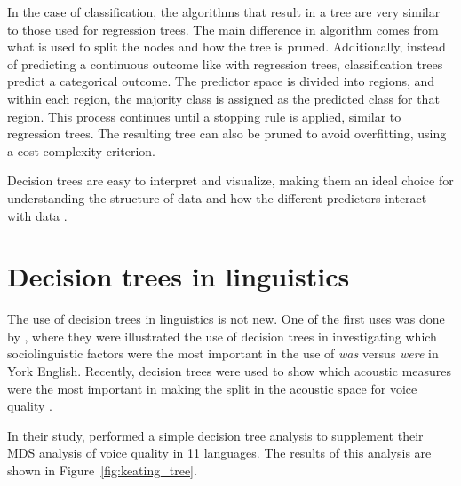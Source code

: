 In the case of classification, the algorithms that result in a tree are very similar to those used for regression trees. The main difference in algorithm comes from what is used to split the nodes and how the tree is pruned. Additionally, instead of predicting a continuous outcome like with regression trees, classification trees predict a categorical outcome. The predictor space is divided into regions, and within each region, the majority class is assigned as the predicted class for that region. This process continues until a stopping rule is applied, similar to regression trees. The resulting tree can also be pruned to avoid overfitting, using a cost-complexity criterion.

Decision trees are easy to interpret and visualize, making them an ideal choice for understanding the structure of data and how the different predictors interact with data \citep{hastieElementsStatisticalLearning2009,jamesIntroductionStatisticalLearning2021}.

\section{Decision trees in linguistics}\label{sec:bagging_DecisionTrees}

The use of decision trees in linguistics is not new. One of the first uses was done by \citet{tagliamonteModelsForestsTrees2012}, where they were illustrated the use of decision trees in investigating which sociolinguistic factors were the most important in the use of \textit{was} versus \textit{were} in York English. Recently, decision trees were used to show which acoustic measures were the most important in making the split in the acoustic space for voice quality \citep{keatingCrosslanguageAcousticSpace2023}. 

In their study, \citet{keatingCrosslanguageAcousticSpace2023} performed a simple decision tree analysis to supplement their MDS analysis of voice quality in 11 languages. The results of this analysis are shown in Figure~\ref{fig:keating_tree}. 


